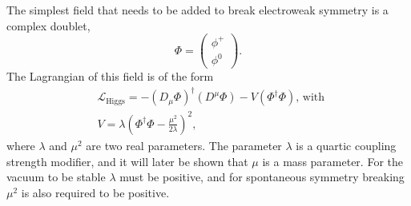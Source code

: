 The simplest field that needs to be added to break electroweak symmetry is a complex doublet,
\begin{equation}\label{eqn:phi_hfield}
\Phi = \begin{pmatrix} \phi^{+} \\
\phi^{0} \end{pmatrix}.
\end{equation}
The Lagrangian of this field is of the form
\begin{equation}\label{eqn:higgs_gen_lag}
\begin{split}
&\mathcal{L}_{\text{Higgs}} = -(D_{\mu}\Phi)^{\dagger}(D^{\mu}\Phi) - V(\Phi^{\dagger}\Phi) \text{, with }\\
&V = \lambda(\Phi^{\dagger}\Phi - \frac{\mu^2}{2\lambda})^2,
\end{split}
\end{equation}
where $\lambda$ and $\mu^2$ are two real parameters. The parameter $\lambda$ 
is a quartic coupling strength modifier, and it will later be shown 
that $\mu$ is a mass parameter.
For the vacuum to be stable $\lambda$ must be positive,
and for spontaneous symmetry breaking $\mu^2$ is also required to be positive.

